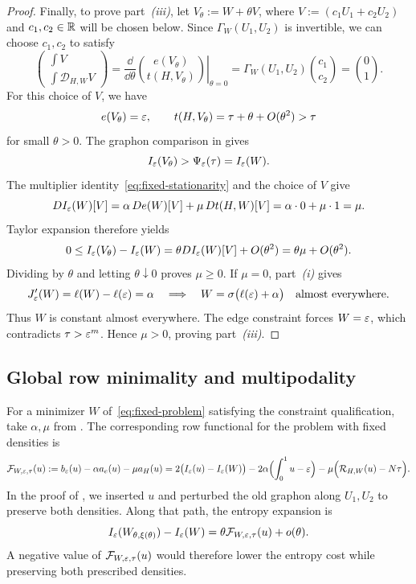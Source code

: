 \begin{proof}
Finally, to prove part~\textit{(iii)}, let $V_\theta:=W+\theta V$,
where $V:=(c_1U_1+c_2U_2)$ and $c_1,c_2\in\mathbb R$ will be chosen below.
Since $\Gamma_W(U_1,U_2)$ is invertible,
we can choose $c_1,c_2$ to satisfy
\[
  \begin{pmatrix} \int V\\[1mm] \int\mathcal D_{H,W}V \end{pmatrix}
  =\left.\frac{\dd}{\dd\theta} \binom{e(V_\theta)}{t(H,V_\theta)}\right|_{\theta=0}
  =\Gamma_W(U_1,U_2)\binom{c_1}{c_2}=\binom{0}{1}.
\]
For this choice of $V$, we have
\[
  e(V_\theta)=\varepsilon,
  \qquad t(H,V_\theta)=\tau+\theta+O(\theta^2)>\tau
\]
for small $\theta>0$. The graphon comparison in
 gives
\[
  I_\varepsilon(V_\theta)>\Psi_\varepsilon(\tau)=I_\varepsilon(W).
\]
The multiplier identity~\eqref{eq:fixed-stationarity} and the choice of $V$ give
\[
  DI_\varepsilon(W)[V]=\alpha\,De(W)[V]+\mu\,Dt(H,W)[V]
  =\alpha\cdot0+\mu\cdot1=\mu.
\]
Taylor expansion therefore yields
\[
  0\le I_\varepsilon(V_\theta)-I_\varepsilon(W)
    =\theta DI_\varepsilon(W)[V]+O(\theta^2)
    =\theta\mu+O(\theta^2).
\]
Dividing by $\theta$ and letting $\theta\downarrow0$ proves $\mu\ge0$.
If $\mu=0$, part~\textit{(i)} gives
\[
  J_\varepsilon'(W)=\ell(W)-\ell(\varepsilon)=\alpha
  \quad\Longrightarrow\quad
  W=\sigma\bigl(\ell(\varepsilon)+\alpha\bigr)
  \quad\text{almost everywhere}.
\]
Thus $W$ is constant almost everywhere.
The edge constraint forces $W=\varepsilon$, which contradicts
$\tau>\varepsilon^m$. Hence $\mu>0$, proving part~\textit{(iii)}.
\end{proof}

\subsection{Global row minimality and multipodality}\label{sec:fixed-row-minimality}

For a minimizer $W$ of~\eqref{eq:fixed-problem} satisfying the constraint qualification, take
$\alpha,\mu$ from .
The corresponding row functional for the problem with fixed densities is
\begin{equation}\label{eq:fixed-row-functional}
  \mathcal F_{W,\varepsilon,\tau}(u):=b_\varepsilon(u)-\alpha a_e(u)-\mu a_H(u)
  =2\bigl(I_\varepsilon(u)-I_\varepsilon(W)\bigr)
  -2\alpha\Bigl(\int_0^1u-\varepsilon\Bigr)
  -\mu\Bigl(\mathcal R_{H,W}(u)-N\tau\Bigr).
\end{equation}
In the proof of , we inserted $u$ and perturbed
the old graphon along $U_1,U_2$ to preserve both densities. Along that
path, the entropy expansion is
\[
  I_\varepsilon(W_{\theta,\xi(\theta)})-I_\varepsilon(W)
  =\theta\mathcal F_{W,\varepsilon,\tau}(u)+o(\theta).
\]
A negative value of $\mathcal F_{W,\varepsilon,\tau}(u)$ would therefore lower the
entropy cost while preserving both prescribed densities.

